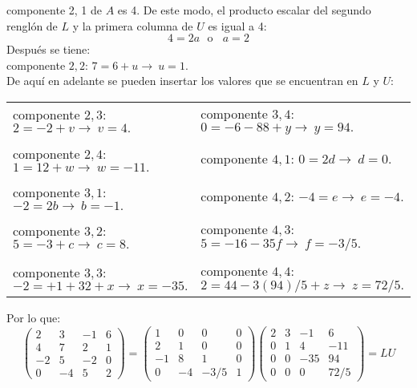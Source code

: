 \documentclass[11pt,letterpaper]{article}
\begin{document}
\begin{enumerate}
componente 2, 1 de $A$ es 4. De este modo, el producto escalar del segundo renglón de $L$ y la primera columna de $U$ es igual a 4:
$$4=2a \ \ \ \text{o}  \ \ \ \ a=2$$
Después se tiene:\\
componente $2,2$: $7=6+u \rightarrow \ u=1.$\\
De aquí en adelante se pueden insertar los valores que se encuentran en $L$ y $U$:
\begin{table}[H]
\centering
\begin{tabular}{l|l}
componente $2,3$: $2=-2+v \rightarrow \ v=4.$ & componente $3,4$: $0=-6-88+y \rightarrow \ y=94.$\\ \\
componente $2,4$: $1=12+w \rightarrow \ w=-11.$ & componente $4,1$: $0=2d \rightarrow \ d=0.$\\ \\
componente $3,1$: $-2=2b \rightarrow \ b=-1.$ & componente $4,2$: $-4=e \rightarrow \ e=-4.$\\ \\
componente $3,2$: $5=-3+c \rightarrow \ c=8.$ & componente $4,3$: $5=-16-35f \rightarrow \ f=-3/5.$\\ \\
componente $3,3$: $-2=+1+32+x \rightarrow \ x=-35.$ & componente $4,4$: $2=44-3(94)/5+z \rightarrow \ z=72/5.$\\ 
\end{tabular}
\end{table}
Por lo que:
\begin{equation*}
\left(\begin{array}{rrrr}
 2 &  3 & -1 & 6\\
 4 &  7 &  2 & 1\\
-2 &  5 & -2 & 0\\
 0 & -4 &  5 & 2
\end{array} \right) =
\left(\begin{array}{rrrr}
 1 &  0 &  0 & 0\\
 2 &  1 &  0 & 0\\
-1 &  8 &  1 & 0\\
 0 &  -4 & -3/5 & 1
\end{array} \right) \left(\begin{array}{rrrr}
 2 &  3 & -1 & 6\\
 0 &  1 &  4 & -11\\
 0 &  0 &  -35 & 94\\
 0 &  0 &  0 & 72/5
\end{array} \right)=LU
\end{equation*}

\end{enumerate}
\end{document}

